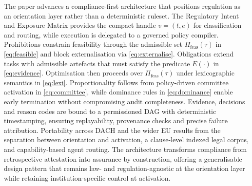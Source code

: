 \documentclass[oneside,10pt]{swissi}
\begin{document}
The paper advances a compliance-first architecture that positions regulation as an orientation layer rather than a deterministic ruleset. The Regulatory Intent and Exposure Matrix provides the compact handle \(v=(t,e)\) for classification and routing, while execution is delegated to a governed policy compiler. Prohibitions constrain feasibility through the admissible set \(\Pi_{\mathrm{feas}}(\tau)\) in \eqref{eq:feasible} and block externalisation via \eqref{eq:externalise}. Obligations extend tasks with admissible artefacts that must satisfy the predicate \(E(\cdot)\) in \eqref{eq:evidence}. Optimisation then proceeds over \(\Pi_{\mathrm{feas}}(\tau)\) under lexicographic semantics in \eqref{eq:lexi}. Proportionality follows from policy-driven committee activation in \eqref{eq:committee}, while dominance rules in \eqref{eq:dominance} enable early termination without compromising audit completeness. Evidence, decisions and reason codes are bound to a permissioned DAG with deterministic timestamping, ensuring replayability, provenance checks and precise failure attribution.  Portability across DACH and the wider EU results from the separation between orientation and activation, a clause-level indexed legal corpus, and capability-based agent routing. The architecture transforms compliance from retrospective attestation into assurance by construction, offering a generalisable design pattern that remains law- and regulation-agnostic at the orientation layer while retaining institution-specific control at activation.\\
\end{document}
